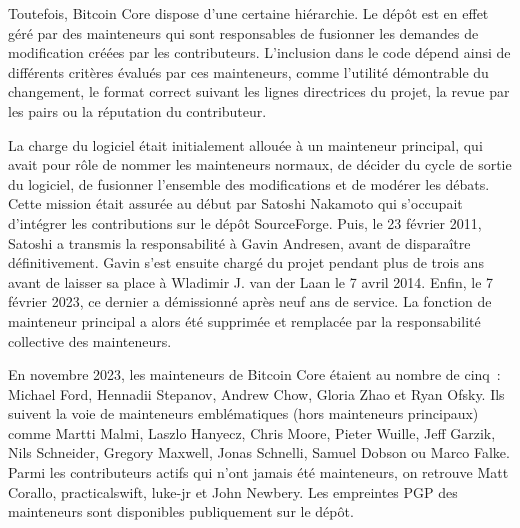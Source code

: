 Toutefois, Bitcoin Core dispose d'une certaine hiérarchie. Le dépôt est en effet géré par des mainteneurs qui sont responsables de fusionner les demandes de modification créées par les contributeurs. L'inclusion dans le code dépend ainsi de différents critères évalués par ces mainteneurs, comme l'utilité démontrable du changement, le format correct suivant les lignes directrices du projet, la revue par les pairs ou la réputation du contributeur. %

La charge du logiciel était initialement allouée à un mainteneur principal, qui avait pour rôle de nommer les mainteneurs normaux, de décider du cycle de sortie du logiciel, de fusionner l'ensemble des modifications et de modérer les débats. Cette mission était assurée au début par Satoshi Nakamoto qui s'occupait d'intégrer les contributions sur le dépôt SourceForge. Puis, le 23 février 2011, Satoshi a transmis la responsabilité à Gavin Andresen, avant de disparaître définitivement. Gavin s'est ensuite chargé du projet pendant plus de trois ans avant de laisser sa place à Wladimir J. van der Laan le 7 avril 2014. Enfin, le 7 février 2023, ce dernier a démissionné après neuf ans de service. La fonction de mainteneur principal a alors été supprimée et remplacée par la responsabilité collective des mainteneurs.

En novembre 2023, les mainteneurs de Bitcoin Core étaient au nombre de cinq~: Michael Ford, Hennadii Stepanov, Andrew Chow, Gloria Zhao et Ryan Ofsky. Ils suivent la voie de mainteneurs emblématiques (hors mainteneurs principaux) comme Martti Malmi, Laszlo Hanyecz, Chris Moore, Pieter Wuille, Jeff Garzik, Nils Schneider, Gregory Maxwell, Jonas Schnelli, Samuel Dobson ou Marco Falke. Parmi les contributeurs actifs qui n'ont jamais été mainteneurs, on retrouve Matt Corallo, practicalswift, luke-jr et John Newbery. Les empreintes PGP des mainteneurs sont disponibles publiquement sur le dépôt.

